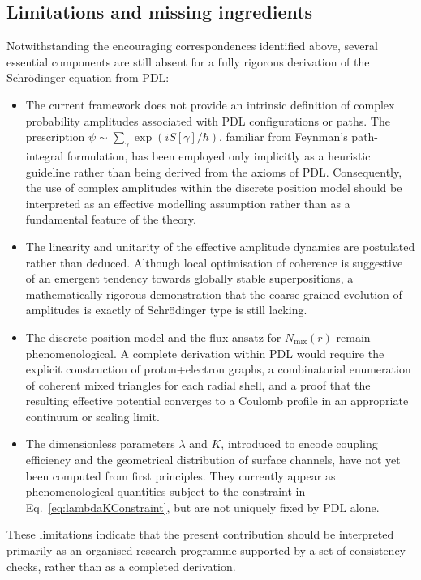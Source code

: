 \documentclass[11pt,a4paper]{article}
\begin{document}
\subsection{Limitations and missing ingredients}

Notwithstanding the encouraging correspondences identified above, several essential components are still absent for a fully rigorous derivation of the Schr\"odinger equation from PDL:
\begin{itemize}
\item The current framework does not provide an intrinsic definition of complex probability amplitudes associated with PDL configurations or paths. The prescription $\psi \sim \sum_{\gamma} \exp(iS[\gamma]/\hbar)$, familiar from Feynman’s path-integral formulation, has been employed only implicitly as a heuristic guideline rather than being derived from the axioms of PDL. Consequently, the use of complex amplitudes within the discrete position model should be interpreted as an effective modelling assumption rather than as a fundamental feature of the theory.\item The linearity and unitarity of the effective amplitude dynamics are postulated rather than deduced. Although local optimisation of coherence is suggestive of an emergent tendency towards globally stable superpositions, a mathematically rigorous demonstration that the coarse-grained evolution of amplitudes is exactly of Schr\"odinger type is still lacking.
\item The discrete position model and the flux ansatz for $N_{\mathrm{mix}}(r)$ remain phenomenological. A complete derivation within PDL would require the explicit construction of proton+electron graphs, a combinatorial enumeration of coherent mixed triangles for each radial shell, and a proof that the resulting effective potential converges to a Coulomb profile in an appropriate continuum or scaling limit.
\item The dimensionless parameters $\lambda$ and $K$, introduced to encode coupling efficiency and the geometrical distribution of surface channels, have not yet been computed from first principles. They currently appear as phenomenological quantities subject to the constraint in Eq.~\eqref{eq:lambdaKConstraint}, but are not uniquely fixed by PDL alone.
\end{itemize}
These limitations indicate that the present contribution should be interpreted primarily as an organised research programme supported by a set of consistency checks, rather than as a completed derivation.
\end{document}
